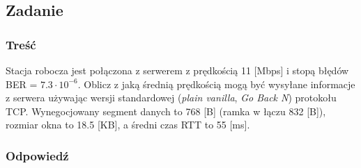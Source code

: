 \documentclass[a4paper,twoside]{article}
\begin{document}
\subsection{Zadanie}
\subsubsection{Treść}
Stacja robocza jest połączona z serwerem z prędkością 11 [Mbps] i stopą błędów BER = $ 7.3 \cdot 10 ^ {-6} $. Oblicz z jaką średnią prędkością mogą być wysyłane informacje z serwera używając wersji standardowej (\emph{plain vanilla}, \emph{Go Back N}) protokołu TCP. Wynegocjowany segment danych to 768 [B] (ramka w łączu 832 [B]), rozmiar okna to 18.5 [KB], a średni czas RTT to 55 [ms].
\subsubsection{Odpowiedź}
\end{document}
